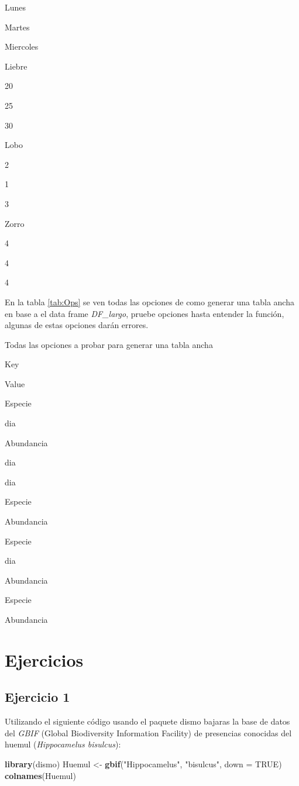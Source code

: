 \documentclass[]{book}
\newenvironment{Shaded}{\begin{snugshade}}{\end{snugshade}}
\newcommand{\DataTypeTok}[1]{\textcolor[rgb]{0.13,0.29,0.53}{#1}}
\newcommand{\KeywordTok}[1]{\textcolor[rgb]{0.13,0.29,0.53}{\textbf{#1}}}
\newcommand{\NormalTok}[1]{#1}
\newcommand{\OtherTok}[1]{\textcolor[rgb]{0.56,0.35,0.01}{#1}}
\newcommand{\StringTok}[1]{\textcolor[rgb]{0.31,0.60,0.02}{#1}}
\begin{document}
Lunes

Martes

Miercoles

Liebre

20

25

30

Lobo

2

1

3

Zorro

4

4

4

En la tabla \ref{tab:Ops} se ven todas las opciones de como generar una
tabla ancha en base a el data frame \emph{DF\_largo}, pruebe opciones
hasta entender la función, algunas de estas opciones darán errores.

\label{tab:Ops}Todas las opciones a probar para generar una tabla ancha

Key

Value

Especie

dia

Abundancia

dia

dia

Especie

Abundancia

Especie

dia

Abundancia

Especie

Abundancia

\hypertarget{ejercicios-2}{%
\section{Ejercicios}\label{ejercicios-2}}

\hypertarget{ejercicio-1-2}{%
\subsection{Ejercicio 1}\label{ejercicio-1-2}}

Utilizando el siguiente código usando el paquete dismo bajaras la base
de datos del \emph{GBIF} (Global Biodiversity Information Facility) de
presencias conocidas del huemul (\emph{Hippocamelus bisulcus}):

\begin{Shaded}
\begin{Highlighting}[]
\KeywordTok{library}\NormalTok{(dismo)}
\NormalTok{Huemul <-}\StringTok{ }\KeywordTok{gbif}\NormalTok{(}\StringTok{"Hippocamelus"}\NormalTok{, }\StringTok{"bisulcus"}\NormalTok{, }\DataTypeTok{down =} \OtherTok{TRUE}\NormalTok{)}
\KeywordTok{colnames}\NormalTok{(Huemul)}
\end{Highlighting}
\end{Shaded}
\end{document}

